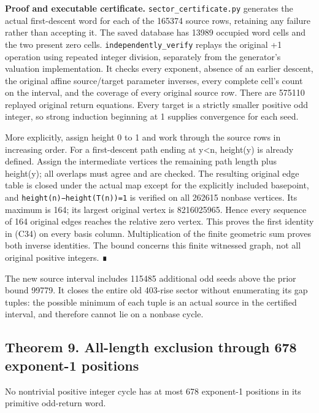 \textbf{Proof and executable certificate.}
\nolinkurl{sector_certificate.py} generates the actual first-descent
word for each of the 165374 source rows, retaining any failure rather
than accepting it. The saved database has 13989 occupied word cells and
the two present zero cells. \nolinkurl{independently_verify} replays the
original +1 operation using repeated integer division, separately from
the generator's valuation implementation. It checks every exponent,
absence of an earlier descent, the original affine source/target
parameter inverses, every complete cell's count on the interval, and the
coverage of every original source row. There are 575110 replayed
original return equations. Every target is a strictly smaller positive
odd integer, so strong induction beginning at 1 supplies convergence for
each seed.

More explicitly, assign height 0 to 1 and work through the source rows
in increasing order. For a first-descent path ending at y\textless n,
height(y) is already defined. Assign the intermediate vertices the
remaining path length plus height(y); all overlaps must agree and are
checked. The resulting original edge table is closed under the actual
map except for the explicitly included basepoint, and
\nolinkurl{height(n)−height(T(n))=1} is verified on all 262615 nonbase
vertices. Its maximum is 164; its largest original vertex is 8216025965.
Hence every sequence of 164 original edges reaches the relative zero
vertex. This proves the first identity in (C34) on every basis column.
Multiplication of the finite geometric sum proves both inverse
identities. The bound concerns this finite witnessed graph, not all
original positive integers. ∎

The new source interval includes 115485 additional odd seeds above the
prior bound 99779. It closes the entire old 403-rise sector without
enumerating its gap tuples: the possible minimum of each tuple is an
actual source in the certified interval, and therefore cannot lie on a
nonbase cycle.

\subsection{Theorem 9. All-length exclusion through 678 exponent-1
positions}

No nontrivial positive integer cycle has at most 678 exponent-1
positions in its primitive odd-return word.

